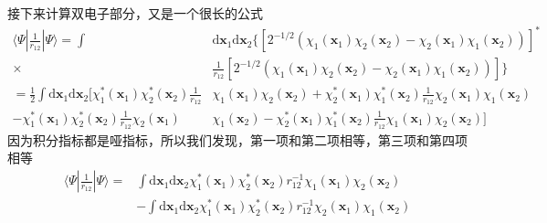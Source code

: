 \documentclass[12pt,a4paper,openany,twoside]{book}
\numberwithin{equation}{section}
\begin{document}
          接下来计算双电子部分，又是一个很长的公式
          \begin{equation}
            \begin{aligned}
              \langle\Psi|\frac{1}{r_{12}}| \Psi \rangle=\int &\mathrm{d} \mathbf{x}_{1} \mathrm{d} \mathbf{x}_{2} \{ \left[2^{-1 / 2}\left(\chi_{1}\left(\mathbf{x}_{1}\right) \chi_{2}\left(\mathbf{x}_{2}\right)-\chi_{2}\left(\mathbf{x}_{1}\right) \chi_{1}\left(\mathbf{x}_{2}\right)\right)\right]^{*} \\ 
              \times& \frac{1}{r_{12}}\left[2^{-1 / 2}\left(\chi_{1}\left(\mathbf{x}_{1}\right) \chi_{2}\left(\mathbf{x}_{2}\right)-\chi_{2}\left(\mathbf{x}_{1}\right) \chi_{1}\left(\mathbf{x}_{2}\right)\right)\right] \} \\
              =\frac{1}{2} \int \mathrm{d} \mathbf{x}_{1} \mathrm{d} \mathbf{x}_{2} [\chi_{1}^{*}\left(\mathbf{x}_{1}\right) \chi_{2}^{*}\left(\mathbf{x}_{2}\right) \frac{1}{r_{12}}&\chi_{1}\left(\mathbf{x}_{1}\right) \chi_{2}\left(\mathbf{x}_{2}\right)+\chi_{2}^{*}\left(\mathbf{x}_{1}\right) \chi_{1}^{*}\left(\mathbf{x}_{2}\right) \frac{1}{r_{12}} \chi_{2}\left(\mathbf{x}_{1}\right) \chi_{1}\left(\mathbf{x}_{2}\right)\\
              -\chi_{1}^{*}\left(\mathbf{x}_{1}\right) \chi_{2}^{*}\left(\mathbf{x}_{2}\right) \frac{1}{r_{12}} \chi_{2}\left(\mathbf{x}_{1}\right) &\chi_{1}\left(\mathbf{x}_{2}\right)-\chi_{2}^{*}\left(\mathbf{x}_{1}\right) \chi_{1}^{*}\left(\mathbf{x}_{2}\right) \frac{1}{r_{12}} \chi_{1}\left(\mathbf{x}_{1}\right) \chi_{2}\left(\mathbf{x}_{2}\right) ]
            \end{aligned}
          \end{equation}
          因为积分指标都是哑指标，所以我们发现，第一项和第二项相等，第三项和第四项相等
          \begin{equation}
            \begin{aligned}\langle\Psi| \frac{1}{r_{12}} | \Psi\rangle=& \int \mathrm{d} \mathbf{x}_{1} \mathrm{d} \mathbf{x}_{2} \chi_{1}^{*}\left(\mathbf{x}_{1}\right) \chi_{2}^{*}\left(\mathbf{x}_{2}\right) r_{12}^{-1} \chi_{1}\left(\mathbf{x}_{1}\right) \chi_{2}\left(\mathbf{x}_{2}\right) \\ &-\int \mathrm{d} \mathbf{x}_{1} \mathrm{d} \mathbf{x}_{2} \chi_{1}^{*}\left(\mathbf{x}_{1}\right) \chi_{2}^{*}\left(\mathbf{x}_{2}\right) r_{12}^{-1} \chi_{2}\left(\mathbf{x}_{1}\right) \chi_{1}\left(\mathbf{x}_{2}\right) \end{aligned}
          \end{equation}
\end{document}
